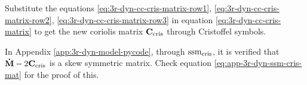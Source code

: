 Substitute the equations \ref{eq:3r-dyn-cc-cris-matrix-row1}, \ref{eq:3r-dyn-cc-cris-matrix-row2}, \ref{eq:3r-dyn-cc-cris-matrix-row3} in equation \ref{eq:3r-dyn-cc-cris-matrix} to get the new coriolis matrix $\mathbf{C}_{\textup{cris}}$ through Cristoffel symbols.

In Appendix \ref{app:3r-dyn-model-pycode}, through $\textup{ssm}_{\textup{cris}}$, it is verified that $\mathbf{\dot{M}} - 2\mathbf{C}_{\textup{cris}}$ is a skew symmetric matrix. Check equation \ref{eq:app-3r-dyn-ssm-cris-mat} for the proof of this.

